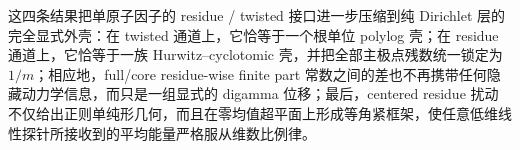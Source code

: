 \noindent
这四条结果把单原子因子的 residue / twisted 接口进一步压缩到纯 Dirichlet 层的完全显式外壳：在 twisted 通道上，它恰等于一个根单位 polylog 壳；在 residue 通道上，它恰等于一族 Hurwitz--cyclotomic 壳，并把全部主极点残数统一锁定为 \(1/m\)；相应地，full/core residue-wise finite part 常数之间的差也不再携带任何隐藏动力学信息，而只是一组显式的 digamma 位移；最后，centered residue 扰动不仅给出正则单纯形几何，而且在零均值超平面上形成等角紧框架，使任意低维线性探针所接收到的平均能量严格服从维数比例律。



\endinput
